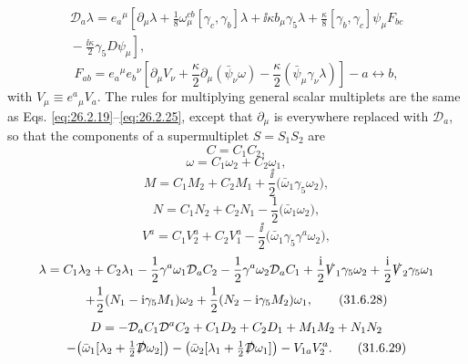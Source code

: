 \begin{multline}
  \mathcal D_a\lambda
  =e_a{}^\mu\left[
    \partial_\mu\lambda
    +\frac{1}{8}\omega_\mu^{cb}[\gamma_c,\gamma_b]\lambda
    +\ii\kappa b_\mu\gamma_5\lambda
    +\frac{\kappa}{8}[\gamma_b,\gamma_c]\psi_\mu F_{bc}\right.\\
  \left.
    {}-\frac{\ii\kappa}{2}\gamma_5D\psi_\mu
  \right],
  \tag{31.6.21}\label{eq:31.6.21}
\end{multline}
\begin{equation}
  F_{ab}
  =e_a{}^\mu e_b{}^\nu\left[
    \partial_\mu V_\nu
    +\frac{\kappa}{2}\partial_\mu(\bar\psi_\nu\omega)
    -\frac{\kappa}{2}(\bar\psi_\mu\gamma_\nu\lambda)
  \right]-a\leftrightarrow b,
  \tag{31.6.22}\label{eq:31.6.22}
\end{equation}
with \(V_\mu\equiv e^a{}_\mu V_a\). The rules for multiplying general
scalar multiplets are the same as Eqs. \eqref{eq:26.2.19}--\eqref{eq:26.2.25},
except that \(\partial_\mu\) is everywhere replaced with \(\mathcal D_a\),
so that the components of a supermultiplet \(S=S_1S_2\) are
\begin{equation}
  C=C_1C_2,
  \tag{31.6.23}\label{eq:31.6.23}
\end{equation}
\begin{equation}
  \omega=C_1\omega_2+C_2\omega_1,
  \tag{31.6.24}\label{eq:31.6.24}
\end{equation}
\begin{equation}
  M=C_1M_2+C_2M_1+\frac{\ii}{2}
    \bigl(\bar\omega_1\gamma_5\omega_2\bigr),
  \tag{31.6.25}\label{eq:31.6.25}
\end{equation}
\begin{equation}
  N=C_1N_2+C_2N_1-\frac{1}{2}
    \bigl(\bar\omega_1\omega_2\bigr),
  \tag{31.6.26}\label{eq:31.6.26}
\end{equation}
\begin{equation}
  V^a=C_1V_2^a+C_2V_1^a-\frac{\ii}{2}
    \bigl(\bar\omega_1\gamma_5\gamma^a\omega_2\bigr),
  \tag{31.6.27}\label{eq:31.6.27}
\end{equation}
\begin{multline}
  \lambda
  =C_1\lambda_2+C_2\lambda_1
  -\frac{1}{2}\gamma^a\omega_1\mathcal D_aC_2
  -\frac{1}{2}\gamma^a\omega_2\mathcal D_aC_1
  +\frac{\ii}{2}\sl{V}_1\gamma_5\omega_2
  +\frac{\ii}{2}\sl{V}_2\gamma_5\omega_1\\
  +\frac{1}{2}(N_1-\ii\gamma_5M_1)\omega_2
  +\frac{1}{2}(N_2-\ii\gamma_5M_2)\omega_1,
  \tag{31.6.28}\label{eq:31.6.28}
\end{multline}
\begin{multline}
  D
  =-\mathcal D_aC_1\mathcal D^aC_2
   +C_1D_2+C_2D_1+M_1M_2+N_1N_2\\
  -\bigl(\bar\omega_1[\lambda_2+\tfrac{1}{2}
      \sl{\mathcal D}\omega_2]\bigr)
  -\bigl(\bar\omega_2[\lambda_1+\tfrac{1}{2}
      \sl{\mathcal D}\omega_1]\bigr)
  -V_{1a}V_2^a.
  \tag{31.6.29}\label{eq:31.6.29}
\end{multline}

